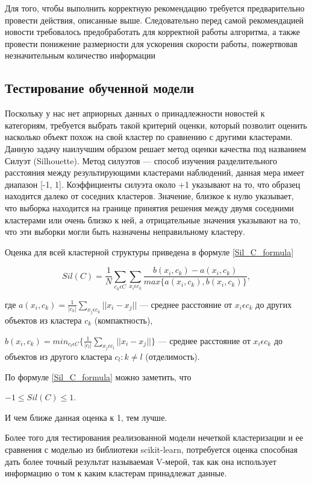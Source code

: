 Для того, чтобы выполнить корректную рекомендацию требуется предварительно провести действия, описанные выше. Следовательно перед самой рекомендацией новости требовалось предобработать для корректной работы алгоритма, а также провести понижение размерности для ускорения скорости работы, пожертвовав незначительным количество информации

\subsection{Тестирование обученной модели}

Поскольку у нас нет априорных данных о принадлежности новостей к категориям, требуется выбрать такой критерий оценки, который позволит оценить насколько объект похож на свой кластер по сравнению с другими кластерами. Данную задачу наилучшим образом решает метод оценки качества под названием Силуэт (Silhouette). Метод силуэтов --- способ изучения разделительного расстояния между результирующими кластерами наблюдений, данная мера имеет диапазон [-1, 1]. Коэффициенты силуэта около +1 указывают на то, что образец находится далеко от соседних кластеров. Значение, близкое к нулю указывает, что выборка находится на границе принятия решения между двумя соседними кластерами или очень близко к ней, а отрицательные значения указывают на то, что эти выборки могли быть назначены неправильному кластеру.

Оценка для всей кластерной структуры приведена в формуле \ref{Sil_C_formula}

\begin{equation}
\label{Sil_C_formula}
Sil(C) = \frac{1}{N}\sum_{c_k\epsilon C}\sum_{x_i\epsilon c_k}\frac{b(x_i, c_k) - a(x_i, c_k)}{max\{a(x_i, c_k), b(x_i, c_k)\}},
\end{equation}

где $a(x_i, c_k) = \frac{1}{|c_k|}\sum_{x_j\epsilon c_k}||x_i - x_j||$ --- среднее расстояние от $x_i \epsilon c_k$ до других объектов из кластера $c_k$ (компактность),

$b(x_i, c_k) = min_{c_l\epsilon C}\{\frac{1}{|c_l|}\sum_{x_j \epsilon c_l}||x_i - x_j||\}$ --- среднее расстояние от $x_i \epsilon c_k$ до объектов из другого кластера $c_l : k \neq l$ (отделимость).

По формуле \ref{Sil_C_formula} можно заметить, что

$-1 \leqslant Sil(C) \leqslant 1.$

И чем ближе данная оценка к 1, тем лучше.

Более того для тестирования реализованной модели нечеткой кластеризации и ее сравнения с моделью из библиотеки scikit-learn, потребуется оценка способная дать более точный результат называемая V-мерой, так как она использует информацию о том к каким кластерам принадлежат данные.

